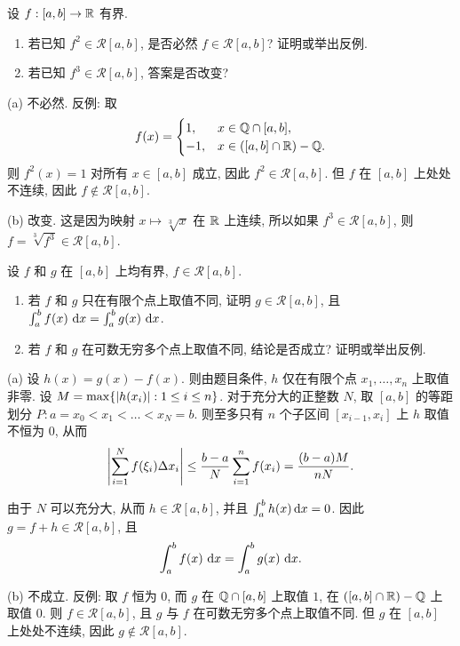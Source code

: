 \documentclass{article}
\begin{document}
\begin{problem}
设 $f:[a,b] \to \mathbb{R}$ 有界.
\begin{enumerate}[label=(\alph*)]
	\item 若已知 $f^2 \in \mathcal{R}[a,b]$, 是否必然 $f \in \mathcal{R}[a,b]$? 证明或举出反例.
	\item 若已知 $f^3 \in \mathcal{R}[a,b]$, 答案是否改变?
\end{enumerate}
\end{problem}

\begin{solution}
  (a) 不必然. 反例: 取
  \[ f(x)=\begin{cases}
  1, & x\in \mathbb{Q}\cap[a,b], \\
  -1, & x\in ([a,b]\cap\mathbb{R})-\mathbb{Q}.
  \end{cases} \]
  则 \( f^2(x)=1 \) 对所有 \( x\in [a,b] \) 成立, 因此 \( f^2 \in \mathcal{R}[a,b] \). 但 \( f \) 在 \( [a,b] \) 上处处不连续, 因此 \( f \notin \mathcal{R}[a,b] \).

  (b) 改变. 这是因为映射 \( x\mapsto \sqrt[3]{x} \) 在 \( \mathbb{R} \) 上连续, 所以如果 \( f^3 \in \mathcal{R}[a,b] \), 则 \( f = \sqrt[3]{f^3} \in \mathcal{R}[a,b] \).
\end{solution}



\begin{problem}
设 $f$ 和 $g$ 在 $[a,b]$ 上均有界, $f \in \mathcal{R}[a,b]$.
\begin{enumerate}[label=(\alph*)]
	\item 若 $f$ 和 $g$ 只在有限个点上取值不同, 证明 $g \in \mathcal{R}[a,b]$, 且 $\int_a^b f(x)\,\,\mathrm{d} x = \int_a^b g(x)\,\,\mathrm{d} x$.
	\item 若 $f$ 和 $g$ 在可数无穷多个点上取值不同, 结论是否成立? 证明或举出反例.
\end{enumerate}
\end{problem}

\begin{solution}
  (a) 设 \( h(x)=g(x)-f(x) \). 则由题目条件, \( h \) 仅在有限个点 \( x_1, \dots,x_n \) 上取值非零. 设 \( M=\max\{\left|h(x_i)\right|:1\le i\le n\} \). 对于充分大的正整数 \( N \), 取 \( [a,b] \) 的等距划分 \( P: a=x_0<x_1<\dots<x_N=b \). 则至多只有 \( n \) 个子区间 \( [x_{i-1}, x_i] \) 上 \( h \) 取值不恒为 \( 0 \), 从而
  \[ \left|\sum_{i=1}^{N}f(\xi_i)\Delta x_i\right|\le \frac{b-a}{N}\sum_{i=1}^{n}f(x_i)=\frac{(b-a)M}{nN}. \]

  由于 \( N \) 可以充分大, 从而 \( h \in \mathcal{R}[a,b] \), 并且 \( \int_{a}^{b}h(x)\,\mathrm{d} x=0 \). 因此 \( g=f+h \in \mathcal{R}[a,b] \), 且 
  \[ \int_a^b f(x)\,\,\mathrm{d} x = \int_a^b g(x)\,\,\mathrm{d} x. \]

  (b) 不成立. 反例: 取 \( f \) 恒为 \( 0 \), 而 \( g \) 在 \( \mathbb{Q}\cap[a,b] \) 上取值 \( 1 \), 在 \( ([a,b]\cap\mathbb{R})-\mathbb{Q} \) 上取值 \( 0 \). 则 \( f \in \mathcal{R}[a,b] \), 且 \( g \) 与 \( f \) 在可数无穷多个点上取值不同. 但 \( g \) 在 \( [a,b] \) 上处处不连续, 因此 \( g \notin \mathcal{R}[a,b] \).
\end{solution}
\end{document}
